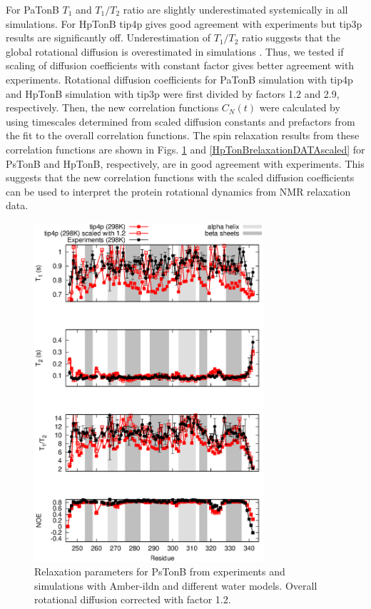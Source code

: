 \documentclass[pre,aps,floatfix,authordate1-4,twocolumn]{revtex4-1}
\begin{document}
For PaTonB $T_1$ and $T_1/T_2$ ratio are slightly underestimated  systemically in all simulations.
For HpTonB tip4p gives good agreement with experiments but tip3p results are
significantly off. Underestimation of $T_1/T_2$ ratio suggests that the global rotational
diffusion is overestimated in simulations \cite{??}. Thus, we tested if scaling of
diffusion coefficients with constant factor gives better agreement with experiments. 
Rotational diffusion coefficients for PaTonB simulation with tip4p and HpTonB simulation with tip3p
were first divided by factors 1.2 and 2.9, respectively. Then, the new correlation functions $C_N(t)$
were calculated by using timescales determined from scaled diffusion constants and prefactors
from the fit to the overall correlation functions. The spin relaxation results from these
correlation functions are shown in Figs. \ref{PsTonBrelaxationDATAscaled} and
\ref{HpTonBrelaxationDATAscaled} for PsTonB and HpTonB, respectively,
are in good agreement with experiments. This suggests that the new correlation functions
with the scaled diffusion coefficients can be used to interpret the protein rotational
dynamics from NMR relaxation data.
\begin{figure}[!h]
  \includegraphics[width=8.5cm]{../Figs/PsTonBrelaxationDATAscaled.eps}%
  \caption{Relaxation parameters for PsTonB from
    experiments and simulations with Amber-ildn and different water models.
    Overall rotational diffusion corrected with factor 1.2.    
    \label{PsTonBrelaxationDATAscaled}}%
\end{figure}
\end{document}
